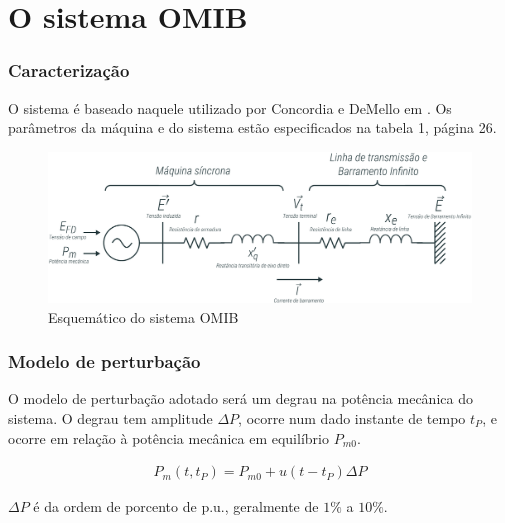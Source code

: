 \documentclass[10pt, compress,xcolor={svgnames,dvipsnames,x11names}]{beamer}
\begin{document}
\section{O sistema OMIB}%
\begin{frame}%
\frametitle{Caracterização}
\scriptsize

	O sistema é baseado naquele utilizado por Concordia e DeMello em \cite{concordia}. Os parâmetros da máquina e do sistema estão especificados na tabela 1, página 26.

	\begin{center}
		\begin{figure}
			\includegraphics[width = 1\textwidth]{../images/presentation/gerador.pdf}
			\caption{Esquemático do sistema OMIB}
			\label{fig::figuraOMIB}
		\end{figure}
	\end{center}


\normalsize
\end{frame}%

\begin{frame}%
\frametitle{Modelo de perturbação}
\scriptsize

	O modelo de perturbação adotado será um degrau na potência mecânica do sistema. O degrau tem amplitude $\Delta P$, ocorre num dado instante de tempo $t_P$, e ocorre em relação à potência mecânica em equilíbrio $P_{m0}$.

\begin{gather}
P_m\left(t,t_P\right) = P_{m0} + u\left(t - t_P\right)\Delta P
\end{gather}

	$\Delta P$ é da ordem de porcento de p.u., geralmente de $1\%$ a $10\%$.

\normalsize
\end{frame}%
\end{document}
